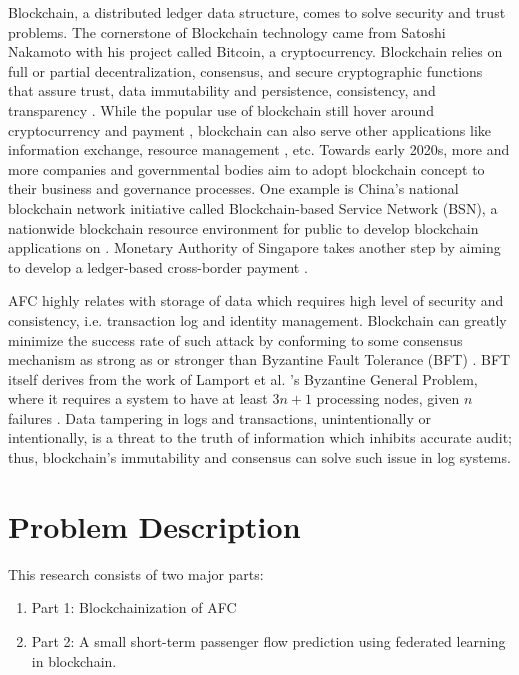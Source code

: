 \documentclass[a4paper,12pt,oneside, utf8x]{report}
\begin{document}
Blockchain, a distributed ledger data structure, comes to solve security and trust problems. The cornerstone of Blockchain technology came from Satoshi Nakamoto \cite{s7} with his project called Bitcoin, a cryptocurrency. Blockchain relies on full or partial decentralization, consensus, and secure cryptographic functions that assure trust, data immutability and persistence, consistency, and transparency \cite{y40,y43}. While the popular use of blockchain still hover around cryptocurrency and payment \cite{y44}, blockchain can also serve other applications like information exchange, resource management \cite{y40}, etc. Towards early 2020s, more and more companies and governmental bodies aim to adopt blockchain concept to their business and governance processes. One example is China’s national blockchain network initiative called Blockchain-based Service Network (BSN), a nationwide blockchain resource environment for public to develop blockchain applications on \cite{y8}. Monetary Authority of Singapore takes another step by aiming to develop a ledger-based cross-border payment \cite{y72}.

AFC highly relates with storage of data which requires high level of security and consistency, i.e. transaction log and identity management. Blockchain can greatly minimize the success rate of such attack by conforming to some consensus mechanism as strong as or stronger than Byzantine Fault Tolerance (BFT) \cite{y40}. BFT itself derives from the work of Lamport et al. \cite{s}'s Byzantine General Problem, where it requires a system to have at least $3n + 1$ processing nodes, given $n$ failures \cite{s16}. Data tampering in logs and transactions, unintentionally or intentionally, is a threat to the truth of information which inhibits accurate audit; thus, blockchain's immutability and consensus can solve such issue in log systems\cite{n1}.






\section{Problem Description}
\label{sprobdesc}
This research consists of two major parts:
\begin{enumerate}
	\item Part 1: Blockchainization of AFC
	\item Part 2: A small short-term passenger flow prediction using federated learning in blockchain.
\end{enumerate}
\end{document}
